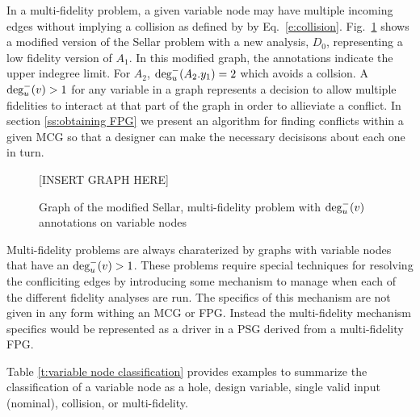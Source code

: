   In a multi-fidelity problem, a given variable node may have multiple incoming 
  edges without implying a collision as defined by by Eq.~\ref{e:collision}. 
  Fig.~\ref{f:collision_example} shows a modified version of the Sellar problem 
  with a new analysis, $D_0$, representing a low fidelity version of $A_1$. 
  In this modified graph, the annotations indicate the upper indegree limit. For 
  $A_2$, $\textrm{deg}^-_u(A_2.y_1) = 2$ which avoids a collsion. A  
  $\textrm{deg}^-_u(v) > 1$ for any variable in a graph represents a decision to 
  allow multiple fidelities to interact at that part of the graph in order to allieviate
  a conflict. In section \ref{ss:obtaining FPG} we present an algorithm for finding 
  conflicts within a given MCG so that a designer can make the necessary decisisons about each 
  one in turn. 
  \begin{figure}
    \begin{center}
    [INSERT GRAPH HERE]
    \caption{Graph of the modified Sellar, multi-fidelity problem with $\textrm{deg}^-_u(v)$ annotations on variable nodes\label{f:collision_example}}
  \end{center}
  \end{figure}

  Multi-fidelity problems are always charaterized by graphs with variable 
  nodes that have an $\textrm{deg}^-_u(v) > 1$. These problems require 
  special techniques for resolving the confliciting edges by introducing some mechanism
  to manage when each of the different fidelity analyses are 
  run\cite{march2012provably,alexandrov2001approximation,Huang_Allen_Notz_Miller_2006}.
  The specifics of this mechanism are not given in any form withing an MCG or 
  FPG. Instead the multi-fidelity mechanism specifics would be represented as a 
  driver in a PSG derived from a multi-fidelity FPG. 

Table \ref{t:variable node classification} provides examples to summarize the classification of a variable node as a hole, design variable, single valid input (nominal), collision, or multi-fidelity.

